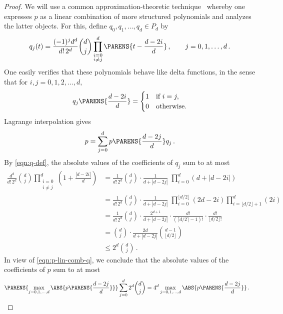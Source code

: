 \begin{proof}
We will use a common approximation-theoretic 
technique~\cite{cheney-book,rivlin-book}
whereby one expresses $p$ as a linear
combination of more structured polynomials
and analyzes the latter objects. 
For this, define $q_0,q_1,\dots,q_d\in P_d$ by 
\begin{align}
 q_j(t) = \frac{(-1)^j d^d}{d!\,2^d}{d\choose j}
\prod_{\substack{i=0\\i\ne j}}^d \PARENS{t - \frac{d-2i}d}\,,
\qquad j=0,1,\dots,d\,.
\label{eqn:q-def}
\end{align}
One easily verifies that these polynomials behave like
delta functions, in the sense that for 
$i,j=0,1,2,\dots,d,$ 
\begin{align*}
q_j\PARENS{\frac {d-2i}d} = \begin{cases}
1 &\text{if $i=j,$}\\
0 &\text{otherwise.}
\end{cases}
\end{align*}
Lagrange interpolation gives
\begin{align}
p=\sum_{j=0}^d p\PARENS{\frac {d-2j}d}q_j\,.
\label{eqn:p-lin-comb-q}
\end{align}
By \eqref{eqn:q-def}, the absolute values of the
coefficients of $q_j$ sum to at most
\begin{align*}
\frac{d^d}{d!\,2^d}{d\choose j}\prod_{\substack{i=0\\i\ne
j}}^d\left(1+\frac {|d-2i|}d\right)&=
\frac{1}{d!\,2^d}{d\choose j}\cdot \frac1{d+|d-2j|}\;
\prod_{i=0}^d(d+|d-2i|)\\
&=
\frac{1}{d!\,2^d}{d\choose j}\cdot \frac1{d+|d-2j|}\;
\prod_{i=0}^{\lfloor d/2\rfloor} (2d-2i) 
\prod_{i=\lfloor d/2\rfloor+1}^d (2i) \\
&=
\frac{1}{d!\,2^d}{d\choose j}\cdot \frac{2^{d+1}}{d+|d-2j|}
\cdot \frac{d!}{\left(\lceil d/2\rceil-1\right)!} 
\cdot \frac{d!}{\lfloor d/2\rfloor!} \\
&=
{d\choose j}\cdot \frac{2d}{d+|d-2j|} {d-1 \choose \lfloor d/2\rfloor} \\
&\leq 2^d {d\choose j}\,. \end{align*}
In view of \eqref{eqn:p-lin-comb-q}, we conclude that
the absolute values of the coefficients of
$p$ sum to at most
\begin{align*}
\PARENS{\max_{j=0,1,\dots,d}\ABS{p\PARENS{\frac
{d-2j}d}}}
\sum_{j=0}^d 2^d{d\choose j} =4^d 
\max_{j=0,1,\dots,d}\ABS{p\PARENS{\frac {d-2j}d}}\,.& \qedhere
\end{align*}
\end{proof}

